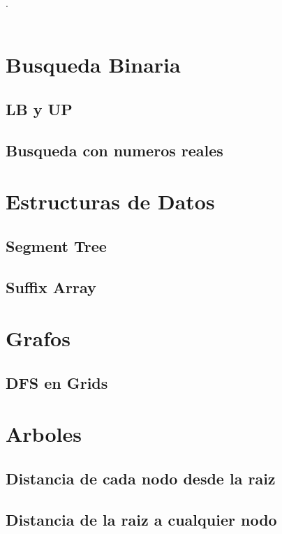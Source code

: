 

\def\title{Competitive Programing Reference}
.\\[0.2cm]
 \\[0.5cm]
\tableofcontents\newpage

\section{Busqueda Binaria}
	\subsection{LB y UP}
	\subsection{Busqueda con numeros reales}

\section{Estructuras de Datos}
	\subsection{Segment Tree}
	\subsection{Suffix Array}

\section{Grafos}
	\subsection{DFS en Grids}

\section{Arboles}
	\subsection{Distancia de cada nodo desde la raiz}
	\subsection{Distancia de la raiz a cualquier nodo}
